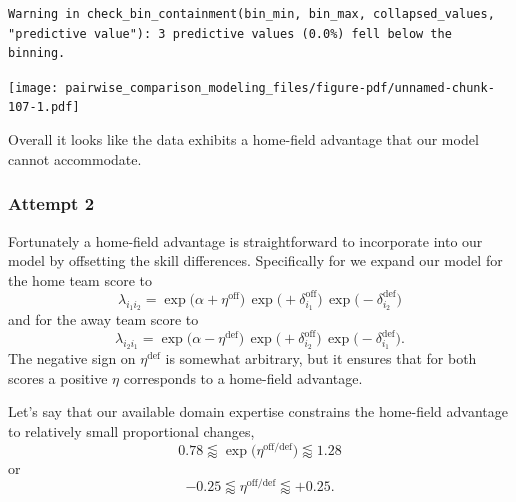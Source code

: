 \documentclass[
  letterpaper,
  DIV=11,
  numbers=noendperiod]{scrartcl}
\begin{document}
\begin{verbatim}
Warning in check_bin_containment(bin_min, bin_max, collapsed_values,
"predictive value"): 3 predictive values (0.0%) fell below the binning.
\end{verbatim}

\texttt{[image: pairwise\_comparison\_modeling\_files/figure-pdf/unnamed-chunk-107-1.pdf]}

Overall it looks like the data exhibits a home-field advantage that our
model cannot accommodate.

\subsubsection{Attempt 2}\label{attempt-2-1}

Fortunately a home-field advantage is straightforward to incorporate
into our model by offsetting the skill differences. Specifically for we
expand our model for the home team score to \[
\lambda_{i_{1} i_{2}}
=
\exp \big(   \alpha + \eta^{\mathrm{off}} \big) \,
\exp \big( + \delta_{i_{1}}^{\mathrm{off}} \big) \,
\exp \big( - \delta_{i_{2}}^{\mathrm{def}} \big)
\] and for the away team score to \[
\lambda_{i_{2} i_{1}}
=
\exp \big(   \alpha - \eta^{\mathrm{def}} \big) \,
\exp \big( + \delta_{i_{2}}^{\mathrm{off}} \big) \,
\exp \big( - \delta_{i_{1}}^{\mathrm{def}} \big).
\] The negative sign on \(\eta^{\mathrm{def}}\) is somewhat arbitrary,
but it ensures that for both scores a positive \(\eta\) corresponds to a
home-field advantage.

Let's say that our available domain expertise constrains the home-field
advantage to relatively small proportional changes, \[
0.78
\lessapprox
\exp \big( \eta^{\mathrm{off/def}} \big)
\lessapprox
1.28
\] or \[
-0.25 \lessapprox \eta^{\mathrm{off/def}}\lessapprox +0.25.
\]
\end{document}
